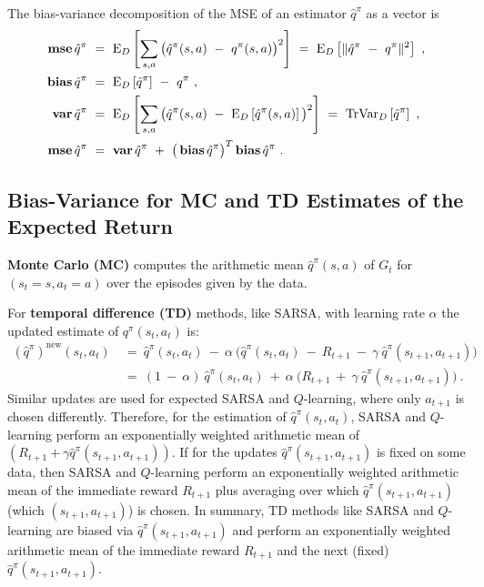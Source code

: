 \documentclass{article}
\newcommand\EXP{\mathbf{\mathrm{E}}}
\newcommand\VAR{\mathbf{\mathrm{Var}}}
\newcommand\TR{\mathbf{\mathrm{Tr}}}
\newcommand\nn{\mathrm{new}}
\newcommand{\mse}{\mathop{\bf mse}}
\newcommand{\bias}{\mathop{\bf bias}}
\newcommand{\var}{\mathop{\bf var}}
\begin{document}
\begin{appendices}
The bias-variance decomposition of the MSE of an estimator
$\hat{q}^\pi$ as a vector is
\begin{align}
  \label{eq:mseVec}
  \mse \hat{q}^\pi  \ &= \ \EXP_D \left[ \sum_{s,a} \big(
    \hat{q}^\pi(s,a)\ - \ q^\pi(s,a) \big)^2  \right] \ = \ \EXP_D
  \left[ \| \hat{q}^\pi \ - \ q^\pi \|^2  \right] \ , \\ 
  \bias \hat{q}^\pi \ &= \ \EXP_D \left[ \hat{q}^\pi \right] \ - \
  q^\pi \ , \\
 \var \hat{q}^\pi \ &= \ \EXP_D \left[ \sum_{s,a} \big( \hat{q}^\pi(s,a) \ - \
  \EXP_D \left[\hat{q}^\pi(s,a) \right] \big)^2  \right] \ = \ \TR \VAR_D
 \left[ \hat{q}^\pi \right] \ , \\ 
 \mse \hat{q}^\pi  \ &= \ \var \hat{q}^\pi  \ + \
 \big( \bias \hat{q}^\pi \big)^T \bias \hat{q}^\pi \ .
\end{align}




\subsection{Bias-Variance for MC and TD Estimates of the Expected Return}
\label{sec:Abias_variance_estimator}

{\bf Monte Carlo (MC)} computes the arithmetic mean
$\hat{q}^\pi(s,a)$ of $G_t$ for $(s_t=s,a_t=a)$ over the episodes
given by the data. 


For {\bf temporal difference (TD)} methods,
like SARSA, with learning rate $\alpha$ the updated estimate of ${q}^\pi(s_t,a_t)$ is:
\begin{align} \nonumber
  \left(\hat{q}^\pi\right)^{\nn}(s_t,a_t) \ &= \ 
  \hat{q}^\pi(s_t,a_t) \ - \
  \alpha \ \big( \hat{q}^\pi(s_t,a_t) \ - \ R_{t+1} \ - \
  \gamma \ \hat{q}^\pi(s_{t+1}, a_{t+1}) \big) \\
  &= \ (1 \ - \ \alpha) \ \hat{q}^\pi(s_t,a_t) \ + \
  \alpha \ \big( R_{t+1} \ + \ \gamma \ \hat{q}^\pi(s_{t+1}, a_{t+1})\big) \ .
\end{align}
Similar updates are used for expected SARSA and $Q$-learning, where
only $a_{t+1}$ is chosen differently. 
Therefore,
for the estimation of $\hat{q}^\pi(s_t,a_t)$, SARSA and $Q$-learning perform 
an exponentially weighted arithmetic mean of  $(R_{t+1} +  \gamma  \hat{q}^\pi(s_{t+1}, a_{t+1}))$.
If for the updates $\hat{q}^\pi(s_{t+1}, a_{t+1})$ is fixed on some data, then
SARSA and $Q$-learning perform an exponentially weighted arithmetic mean of the immediate
reward $R_{t+1}$ plus averaging over which $\hat{q}^\pi(s_{t+1},
a_{t+1})$ (which $(s_{t+1}, a_{t+1})$) is chosen.
In summary, TD methods like SARSA and $Q$-learning are biased via
$\hat{q}^\pi(s_{t+1}, a_{t+1})$ and perform an exponentially weighted arithmetic mean of the
immediate reward $R_{t+1}$ and the next (fixed) $\hat{q}^\pi(s_{t+1}, a_{t+1})$.


\end{appendices}
\end{document}
